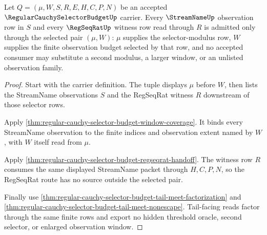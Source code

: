 \begin{theorem}
\label{thm:regular-cauchy-selector-budget-selector-budget-exactness}
Let $Q=(\mu,W,S,R,E,H,C,P,N)$ be an accepted $\RegularCauchySelectorBudgetUp$ carrier. Every $\StreamNameUp$ observation row in $S$ and every $\RegSeqRatUp$ witness row read through $R$ is admitted only through the selected pair $(\mu,W)$: $\mu$ supplies the selector-modulus row, $W$ supplies the finite observation budget selected by that row, and no accepted consumer may substitute a second modulus, a larger window, or an unlisted observation family.
\end{theorem}
\begin{proof}
Start with the carrier definition. The tuple displays $\mu$ before $W$, then lists the StreamName observations $S$ and the RegSeqRat witness $R$ downstream of those selector rows.

Apply \autoref{thm:regular-cauchy-selector-budget-window-coverage}. It binds every StreamName observation to the finite indices and observation extent named by $W$, with $W$ itself read from $\mu$.

Apply \autoref{thm:regular-cauchy-selector-budget-regseqrat-handoff}. The witness row $R$ consumes the same displayed StreamName packet through $H,C,P,N$, so the RegSeqRat route has no source outside the selected pair.

Finally use \autoref{thm:regular-cauchy-selector-budget-tail-meet-factorization} and \autoref{thm:regular-cauchy-selector-budget-tail-meet-nonescape}. Tail-facing reads factor through the same finite rows and export no hidden threshold oracle, second selector, or enlarged observation window.
\end{proof}

